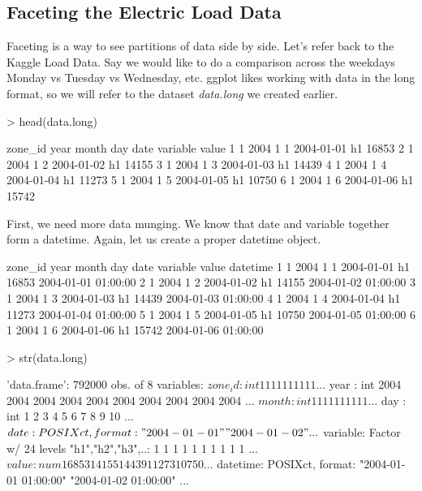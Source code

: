 \documentclass{article}
\begin{document}
\subsection{Faceting the Electric Load Data}

Faceting is a way to see partitions of data side by side.  Let's refer back
to the Kaggle Load Data.  Say we would like to do a comparison across the
weekdays Monday vs Tuesday vs Wednesday, etc.  ggplot likes working with 
data in the long format, so we will refer to the dataset \textit{data.long}
we created earlier.

\begin{Schunk}
\begin{Sinput}
> head(data.long)
\end{Sinput}
\begin{Soutput}
  zone_id year month day       date variable value
1       1 2004     1   1 2004-01-01       h1 16853
2       1 2004     1   2 2004-01-02       h1 14155
3       1 2004     1   3 2004-01-03       h1 14439
4       1 2004     1   4 2004-01-04       h1 11273
5       1 2004     1   5 2004-01-05       h1 10750
6       1 2004     1   6 2004-01-06       h1 15742
\end{Soutput}
\end{Schunk}

First, we need more data munging.  We know that date and variable together
form a datetime.  Again, let us create a proper datetime object.

\begin{Schunk}
\begin{Soutput}
  zone_id year month day       date variable value            datetime
1       1 2004     1   1 2004-01-01       h1 16853 2004-01-01 01:00:00
2       1 2004     1   2 2004-01-02       h1 14155 2004-01-02 01:00:00
3       1 2004     1   3 2004-01-03       h1 14439 2004-01-03 01:00:00
4       1 2004     1   4 2004-01-04       h1 11273 2004-01-04 01:00:00
5       1 2004     1   5 2004-01-05       h1 10750 2004-01-05 01:00:00
6       1 2004     1   6 2004-01-06       h1 15742 2004-01-06 01:00:00
\end{Soutput}
\begin{Sinput}
> str(data.long)
\end{Sinput}
\begin{Soutput}
'data.frame':	792000 obs. of  8 variables:
 $ zone_id : int  1 1 1 1 1 1 1 1 1 1 ...
 $ year    : int  2004 2004 2004 2004 2004 2004 2004 2004 2004 2004 ...
 $ month   : int  1 1 1 1 1 1 1 1 1 1 ...
 $ day     : int  1 2 3 4 5 6 7 8 9 10 ...
 $ date    : POSIXct, format: "2004-01-01" "2004-01-02" ...
 $ variable: Factor w/ 24 levels "h1","h2","h3",..: 1 1 1 1 1 1 1 1 1 1 ...
 $ value   : num  16853 14155 14439 11273 10750 ...
 $ datetime: POSIXct, format: "2004-01-01 01:00:00" "2004-01-02 01:00:00" ...
\end{Soutput}
\end{Schunk}
\end{document}
